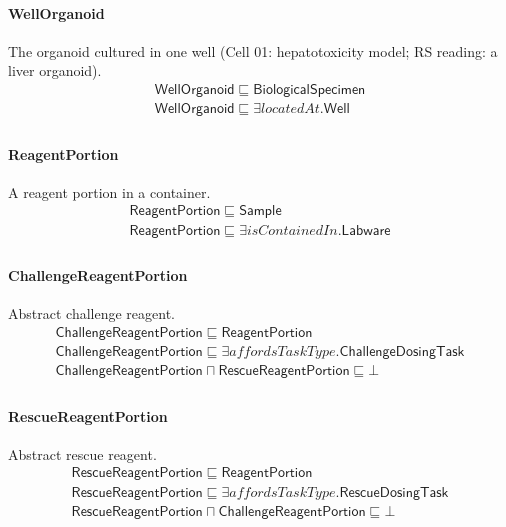 \documentclass[10pt]{article}
\begin{document}
\paragraph{WellOrganoid} The organoid cultured in one well (Cell 01: hepatotoxicity model; RS reading: a liver organoid).
\[\begin{array}{l}
\mathsf{WellOrganoid} \sqsubseteq  \mathsf{BiologicalSpecimen} \\
\mathsf{WellOrganoid} \sqsubseteq  \exists \mathit{locatedAt}.\mathsf{Well} \\
\end{array}\]
\paragraph{ReagentPortion} A reagent portion in a container.
\[\begin{array}{l}
\mathsf{ReagentPortion} \sqsubseteq  \mathsf{Sample} \\
\mathsf{ReagentPortion} \sqsubseteq  \exists \mathit{isContainedIn}.\mathsf{Labware} \\
\end{array}\]
\paragraph{ChallengeReagentPortion} Abstract challenge reagent.
\[\begin{array}{l}
\mathsf{ChallengeReagentPortion} \sqsubseteq  \mathsf{ReagentPortion} \\
\mathsf{ChallengeReagentPortion} \sqsubseteq  \exists \mathit{affordsTaskType}.\mathsf{ChallengeDosingTask} \\
\mathsf{ChallengeReagentPortion} \sqcap  \mathsf{RescueReagentPortion} \sqsubseteq  \bot  \\
\end{array}\]
\paragraph{RescueReagentPortion} Abstract rescue reagent.
\[\begin{array}{l}
\mathsf{RescueReagentPortion} \sqsubseteq  \mathsf{ReagentPortion} \\
\mathsf{RescueReagentPortion} \sqsubseteq  \exists \mathit{affordsTaskType}.\mathsf{RescueDosingTask} \\
\mathsf{RescueReagentPortion} \sqcap  \mathsf{ChallengeReagentPortion} \sqsubseteq  \bot  \\
\end{array}\]
\end{document}
